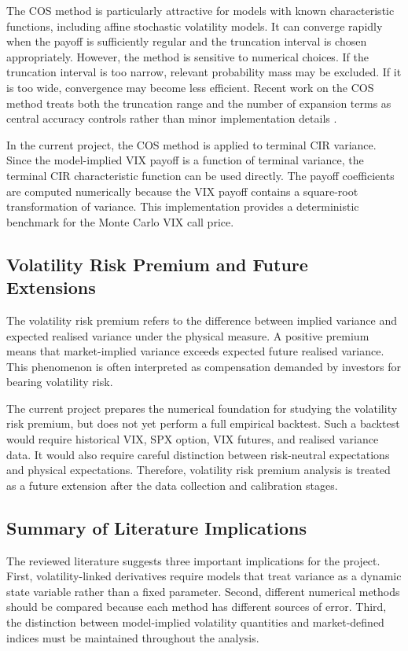 The COS method is particularly attractive for models with known characteristic functions, including affine stochastic volatility models. It can converge rapidly when the payoff is sufficiently regular and the truncation interval is chosen appropriately. However, the method is sensitive to numerical choices. If the truncation interval is too narrow, relevant probability mass may be excluded. If it is too wide, convergence may become less efficient. Recent work on the COS method treats both the truncation range and the number of expansion terms as central accuracy controls rather than minor implementation details \citep{junike2022cos,junike2024cos}.

In the current project, the COS method is applied to terminal CIR variance. Since the model-implied VIX payoff is a function of terminal variance, the terminal CIR characteristic function can be used directly. The payoff coefficients are computed numerically because the VIX payoff contains a square-root transformation of variance. This implementation provides a deterministic benchmark for the Monte Carlo VIX call price.

\subsection{Volatility Risk Premium and Future Extensions}

The volatility risk premium refers to the difference between implied variance and expected realised variance under the physical measure. A positive premium means that market-implied variance exceeds expected future realised variance. This phenomenon is often interpreted as compensation demanded by investors for bearing volatility risk.

The current project prepares the numerical foundation for studying the volatility risk premium, but does not yet perform a full empirical backtest. Such a backtest would require historical VIX, SPX option, VIX futures, and realised variance data. It would also require careful distinction between risk-neutral expectations and physical expectations. Therefore, volatility risk premium analysis is treated as a future extension after the data collection and calibration stages.

\subsection{Summary of Literature Implications}

The reviewed literature suggests three important implications for the project. First, volatility-linked derivatives require models that treat variance as a dynamic state variable rather than a fixed parameter. Second, different numerical methods should be compared because each method has different sources of error. Third, the distinction between model-implied volatility quantities and market-defined indices must be maintained throughout the analysis.

